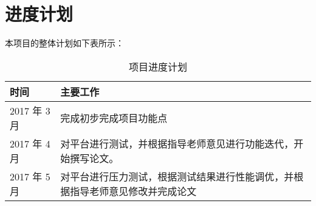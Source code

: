 \section{进度计划}

本项目的整体计划如下表所示：

\begin{table}[!htbp]
\centering
\begin{tabular}{|l|l|}
\hline
时间 & 主要工作 \\ \hline
2017 年 3 月 & 完成初步完成项目功能点 \\ \hline
2017 年 4 月 & 对平台进行测试，并根据指导老师意见进行功能迭代，开始撰写论文。 \\ \hline
2017 年 5 月 & 对平台进行压力测试，根据测试结果进行性能调优，并根据指导老师意见修改并完成论文 \\ \hline

\end{tabular}
\caption{项目进度计划}
\label{table:schedule}
\end{table}


{
\renewcommand{\chapter}[2]{\section*{#2}\addcontentsline{toc}{section}{#2}}

}

